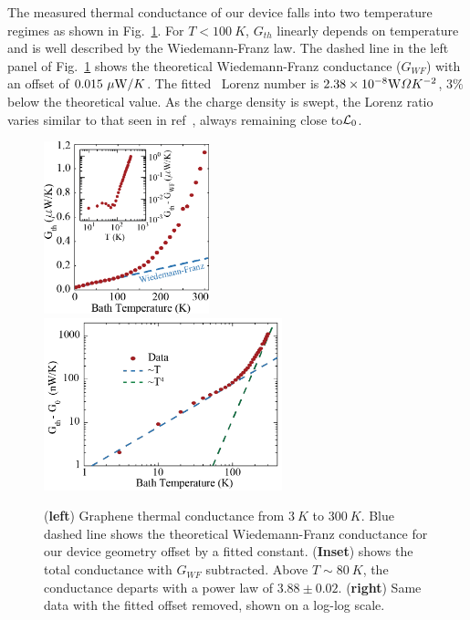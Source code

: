 The measured thermal conductance of our device falls into two temperature regimes as shown in Fig.~\ref{fig:Aria_Gth}. For $T<100~K$, $G_{th}$ linearly depends on temperature and is well described by the Wiedemann-Franz law. The dashed line in the left panel of Fig.~\ref{fig:Aria_Gth} shows the theoretical Wiedemann-Franz conductance ($G_{WF}$) with an offset of $0.015~\mu\mathrm{W}/K$. The fitted~\cite{fong_measurement_2013, yigen_wiedemannfranz_2014} Lorenz number is $2.38\times10^{-8} \mathrm{W}\Omega K^{-2}$, $3\%$ below the theoretical value. As the charge density is swept, the Lorenz ratio varies similar to that seen in ref~\cite{fong_measurement_2013}, always remaining close to$\mathcal{L}_0$.
\begin{figure}
\centering
\includegraphics[height=50mm, valign=t]{figures/high_density_graphene/Gth_lin.png}
\includegraphics[height=50mm, valign=t]{figures/high_density_graphene/Gth_log.png}
\caption{(\textbf{left}) Graphene thermal conductance from $3~K$ to $300~K$. Blue dashed line shows the theoretical Wiedemann-Franz conductance for our device geometry offset by a fitted constant. (\textbf{Inset}) shows the total conductance with $G_{WF}$ subtracted. Above $T\sim 80~K$, the conductance departs with a power law of $3.88 \pm 0.02$. (\textbf{right}) Same data with the fitted offset removed, shown on a log-log scale.}
\label{fig:Aria_Gth}
\end{figure}

